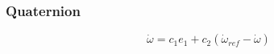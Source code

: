 
\subsubsection{Quaternion}

\[
\dot{\omega}
= c_1 e_1
+ c_2 \left( \dot{\omega}_{ref} - \dot{\omega} \right)

\]

